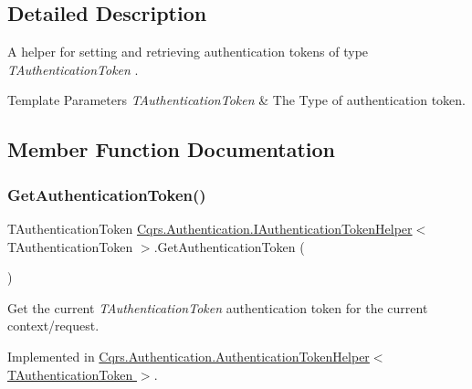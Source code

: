 \subsection{Detailed Description}
A helper for setting and retrieving authentication tokens of type {\itshape T\+Authentication\+Token} . 


\begin{DoxyTemplParams}{Template Parameters}
{\em T\+Authentication\+Token} & The Type of authentication token.\\
\hline
\end{DoxyTemplParams}


\subsection{Member Function Documentation}
\mbox{\label{interfaceCqrs_1_1Authentication_1_1IAuthenticationTokenHelper_a4ccb928b5a6880921226508d36d4afc8_a4ccb928b5a6880921226508d36d4afc8}} 
\subsubsection{\texorpdfstring{Get\+Authentication\+Token()}{GetAuthenticationToken()}}
{\footnotesize\ttfamily T\+Authentication\+Token \hyperlink{interfaceCqrs_1_1Authentication_1_1IAuthenticationTokenHelper}{Cqrs.\+Authentication.\+I\+Authentication\+Token\+Helper}$<$ T\+Authentication\+Token $>$.Get\+Authentication\+Token (\begin{DoxyParamCaption}{ }\end{DoxyParamCaption})}



Get the current {\itshape T\+Authentication\+Token} authentication token for the current context/request. 



Implemented in \hyperlink{classCqrs_1_1Authentication_1_1AuthenticationTokenHelper_ad8c73eb3c1a79d141c406cb7abed1466_ad8c73eb3c1a79d141c406cb7abed1466}{Cqrs.\+Authentication.\+Authentication\+Token\+Helper$<$ T\+Authentication\+Token $>$}.

